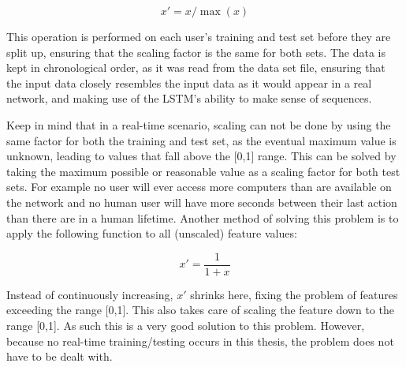 \begin{equation} \label{eq:normalize}
x' = x / \max (x)
\end{equation}

This operation is performed on each user's training and test set before they are split up, ensuring that the scaling factor is the same for both sets. The data is kept in chronological order, as it was read from the data set file, ensuring that the input data closely resembles the input data as it would appear in a real network, and making use of the LSTM's ability to make sense of sequences.

Keep in mind that in a real-time scenario, scaling can not be done by using the same factor for both the training and test set, as the eventual maximum value is unknown, leading to values that fall above the [0,1] range. This can be solved by taking the maximum possible or reasonable value as a scaling factor for both test sets. For example no user will ever access more computers than are available on the network and no human user will have more seconds between their last action than there are in a human lifetime. Another method of solving this problem is to apply the following function to all (unscaled) feature values:

\begin{equation} \label{eq:normalize_2}
x' = \dfrac{1}{1+x}
\end{equation}

Instead of continuously increasing, \(x'\) shrinks here, fixing the problem of features exceeding the range [0,1]. This also takes care of scaling the feature down to the range [0,1]. As such this is a very good solution to this problem. However, because no real-time training/testing occurs in this thesis, the problem does not have to be dealt with.

